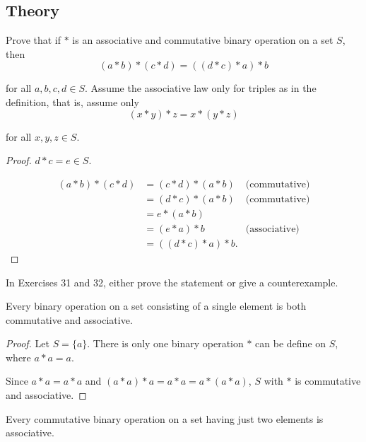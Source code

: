 \subsection*{Theory}

\newpage
\begin{exercise}
    Prove that if $*$ is an associative and commutative binary operation on a set $S$, then
    \[
        (a * b) * (c * d) = ((d * c) * a) * b
    \]

    for all $a, b, c, d\in S$. Assume the associative law only for triples as in the definition, that is, assume only
    \[
        (x * y) * z = x * (y * z)
    \]

    for all $x, y, z\in S$.
\end{exercise}

\begin{proof}
    $d * c = e\in S$.

    \begin{align*}
        (a * b) * (c * d) & = (c * d) * (a * b)  & \text{(commutative)} \\
                          & = (d * c) * (a * b)  & \text{(commutative)} \\
                          & = e * (a * b)                               \\
                          & = (e * a) * b        & \text{(associative)} \\
                          & = ((d * c) * a) * b.
    \end{align*}
\end{proof}

In Exercises 31 and 32, either prove the statement or give a counterexample.

\newpage
\begin{exercise}
    Every binary operation on a set consisting of a single element is both commutative and associative.
\end{exercise}

\begin{proof}
    Let $S = \{ a \}$. There is only one binary operation $*$ can be define on $S$, where $a * a = a$.

    Since $a * a = a * a$ and $(a * a) * a = a * a = a * (a * a)$, $S$ with $*$ is commutative and associative.
\end{proof}

\newpage
\begin{exercise}
    Every commutative binary operation on a set having just two elements is associative.
\end{exercise}

